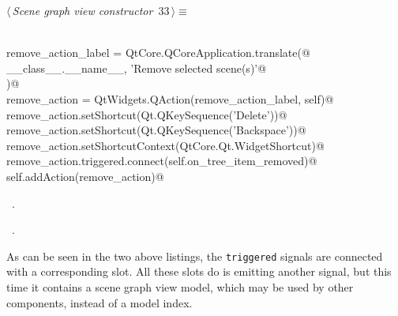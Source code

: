\documentclass[
    a4paper,      %
    10pt,         %
    openright,    %
    notitlepage,  %
    parskip=half, %
]{scrreprt}       %
\theoremstyle{definition}                    %
\begin{document}
\begin{flushleft} \small
\begin{minipage}{\linewidth}\label{scrap39}\raggedright\small
{} $\langle\,${\itshape Scene graph view constructor}\nobreak\ {\footnotesize {33}}$\,\rangle\equiv$
\vspace{-1exm}
\begin{list}{}{} \item
\mbox{}\lstinline@@\\
\mbox{}\lstinline@    remove_action_label = QtCore.QCoreApplication.translate(@\\
\mbox{}\lstinline@        __class__.__name__, 'Remove selected scene(s)'@\\
\mbox{}\lstinline@    )@\\
\mbox{}\lstinline@    remove_action = QtWidgets.QAction(remove_action_label, self)@\\
\mbox{}\lstinline@    remove_action.setShortcut(Qt.QKeySequence('Delete'))@\\
\mbox{}\lstinline@    remove_action.setShortcut(Qt.QKeySequence('Backspace'))@\\
\mbox{}\lstinline@    remove_action.setShortcutContext(QtCore.Qt.WidgetShortcut)@\\
\mbox{}\lstinline@    remove_action.triggered.connect(self.on_tree_item_removed)@\\
\mbox{}\lstinline@    self.addAction(remove_action)@\\
\mbox{}\lstinline@@{\NWsep}
\end{list}
\vspace{-1.5ex}
\footnotesize
\begin{list}{}{\setlength{\itemsep}{-\parsep}\setlength{\itemindent}{-\leftmargin}}
\item \NWtxtMacroDefBy\ .
\item \NWtxtMacroRefIn\ .

\item{}
\end{list}
\end{minipage}\vspace{4ex}
\end{flushleft}
As can be seen in the two above listings, the \verb+triggered+ signals are
connected with a corresponding slot. All these slots do is emitting another
signal, but this time it contains a scene graph view model, which may be used by
other components, instead of a model index.
\end{document}
